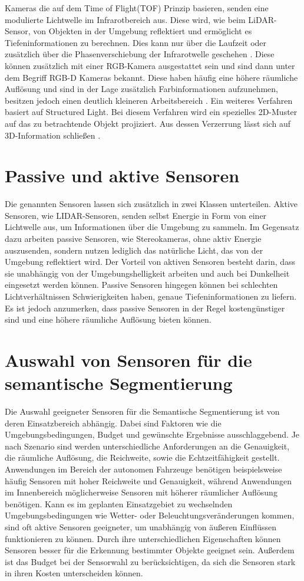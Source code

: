 Kameras die auf dem Time of Flight(TOF) Prinzip basieren, senden eine
modulierte Lichtwelle im Infrarotbereich aus. Diese wird, wie beim
LiDAR-Sensor, von Objekten in der Umgebung reflektiert und ermöglicht es
Tiefeninformationen zu berechnen. Dies kann nur über die Laufzeit oder
zusätzlich über die Phasenverschiebung der Infrarotwelle geschehen
\cite{7025195}. Diese können zusätzlich mit einer RGB-Kamera ausgestattet sein
und sind dann unter dem Begriff RGB-D Kameras bekannt. Diese haben häufig eine
höhere räumliche Auflösung und sind in der Lage zusätzlich Farbinformationen
aufzunehmen, besitzen jedoch einen deutlich kleineren Arbeitsbereich
\cite{9262651}. Ein weiteres Verfahren basiert auf Structured Light. Bei diesem
Verfahren wird ein spezielles 2D-Muster auf das zu betrachtende Objekt
projiziert. Aus dessen Verzerrung lässt sich auf 3D-Information schließen
\cite{7992709}.

\section{Passive und aktive Sensoren}
Die genannten Sensoren lassen sich zusätzlich in zwei Klassen unterteilen.
Aktive Sensoren, wie LIDAR-Sensoren, senden selbst Energie in Form von einer
Lichtwelle aus, um Informationen über die Umgebung zu sammeln. Im Gegensatz
dazu arbeiten passive Sensoren, wie Stereokameras, ohne aktiv Energie
auszusenden, sondern nutzen lediglich das natürliche Licht, das von der
Umgebung reflektiert wird. Der Vorteil von aktiven Sensoren besteht darin, dass
sie unabhängig von der Umgebungshelligkeit arbeiten und auch bei Dunkelheit
eingesetzt werden können. Passive Sensoren hingegen können bei schlechten
Lichtverhältnissen Schwierigkeiten haben, genaue Tiefeninformationen zu
liefern. Es ist jedoch anzumerken, dass passive Sensoren in der Regel
kostengünstiger sind und eine höhere räumliche Auflösung bieten können.

\section{Auswahl von Sensoren für die semantische Segmentierung}

Die Auswahl geeigneter Sensoren für die Semantische Segmentierung ist von deren
Einsatzbereich abhängig. Dabei sind Faktoren wie die Umgebungsbedingungen,
Budget und gewünschte Ergebnisse ausschlaggebend. Je nach Szenario sind werden
unterschiedliche Anforderungen an die Genauigkeit, die räumliche Auflösung, die
Reichweite, sowie die Echtzeitfähigkeit gestellt. Anwendungen im Bereich der
autonomen Fahrzeuge benötigen beispielsweise häufig Sensoren mit hoher
Reichweite und Genauigkeit, während Anwendungen im Innenbereich möglicherweise
Sensoren mit höherer räumlicher Auflösung benötigen. Kann es im geplanten
Einsatzgebiet zu wechselnden Umgebungsbedingungen wie Wetter- oder
Beleuchtungsveränderungen kommen, sind oft aktive Sensoren geeigneter, um
unabhängig von äußeren Einflüssen funktionieren zu können. Durch ihre
unterschiedlichen Eigenschaften können Sensoren besser für die Erkennung
bestimmter Objekte geeignet sein. Außerdem ist das Budget bei der Sensorwahl
zu berücksichtigen, da sich die Sensoren stark in ihren Kosten unterscheiden
können.